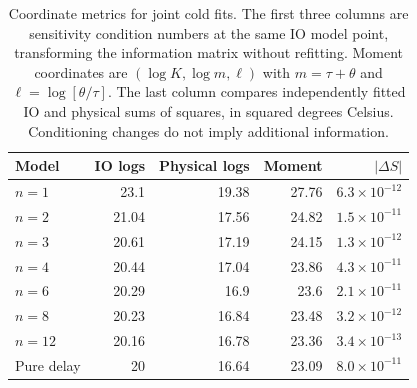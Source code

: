 \begin{table}[tbp]
\centering
\small
\begin{tabular}{lrrrr}
\toprule
Model & IO logs & Physical logs & Moment & $|\Delta S|$ \\
\midrule
$n=1$ & 23.1 & 19.38 & 27.76 & $6.3\times10^{-12}$ \\
$n=2$ & 21.04 & 17.56 & 24.82 & $1.5\times10^{-11}$ \\
$n=3$ & 20.61 & 17.19 & 24.15 & $1.3\times10^{-12}$ \\
$n=4$ & 20.44 & 17.04 & 23.86 & $4.3\times10^{-11}$ \\
$n=6$ & 20.29 & 16.9 & 23.6 & $2.1\times10^{-11}$ \\
$n=8$ & 20.23 & 16.84 & 23.48 & $3.2\times10^{-12}$ \\
$n=12$ & 20.16 & 16.78 & 23.36 & $3.4\times10^{-13}$ \\
Pure delay & 20 & 16.64 & 23.09 & $8.0\times10^{-11}$ \\
\bottomrule
\end{tabular}
\caption{Coordinate metrics for joint cold fits. The first three columns are sensitivity condition numbers at the same IO model point, transforming the information matrix without refitting. Moment coordinates are $(\log K,\log m,\ell)$ with $m=\tau+\theta$ and $\ell=\log[\theta/\tau]$. The last column compares independently fitted IO and physical sums of squares, in squared degrees Celsius. Conditioning changes do not imply additional information.}
\label{tab:coordinate-metrics}
\end{table}
